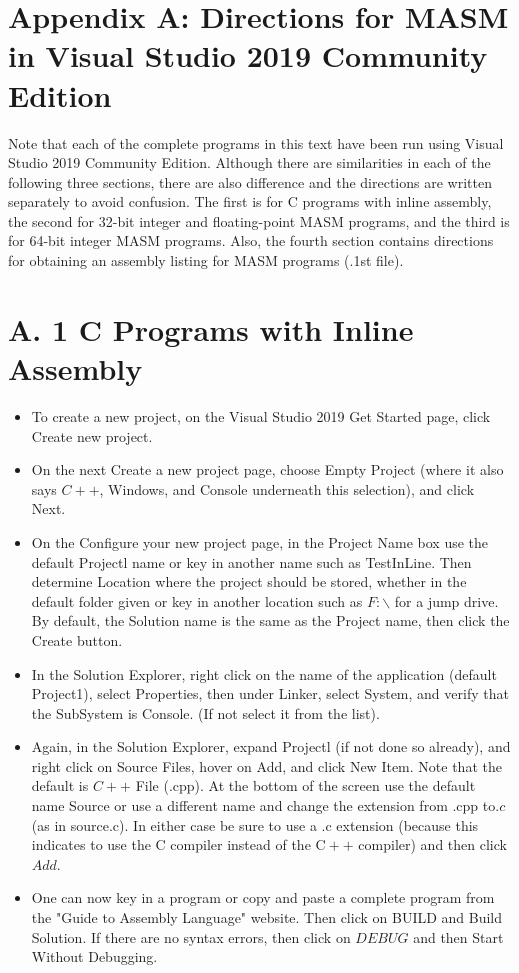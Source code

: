 \documentclass[10pt]{article}
\begin{document}
\section*{Appendix A: Directions for MASM in Visual Studio 2019 Community Edition}
Note that each of the complete programs in this text have been run using Visual Studio 2019 Community Edition. Although there are similarities in each of the following three sections, there are also difference and the directions are written separately to avoid confusion. The first is for C programs with inline assembly, the second for 32-bit integer and floating-point MASM programs, and the third is for 64-bit integer MASM programs. Also, the fourth section contains directions for obtaining an assembly listing for MASM programs (.1st file).

\section*{A. 1 C Programs with Inline Assembly}
\begin{itemize}
  \item To create a new project, on the Visual Studio 2019 Get Started page, click Create new project.
  \item On the next Create a new project page, choose Empty Project (where it also says $C++$, Windows, and Console underneath this selection), and click Next.
  \item On the Configure your new project page, in the Project Name box use the default Projectl name or key in another name such as TestInLine. Then determine Location where the project should be stored, whether in the default folder given or key in another location such as $F: \backslash$ for a jump drive. By default, the Solution name is the same as the Project name, then click the Create button.
  \item In the Solution Explorer, right click on the name of the application (default Project1), select Properties, then under Linker, select System, and verify that the SubSystem is Console. (If not select it from the list).
  \item Again, in the Solution Explorer, expand Projectl (if not done so already), and right click on Source Files, hover on Add, and click New Item. Note that the default is $C++$ File (.cpp). At the bottom of the screen use the default name Source or use a different name and change the extension from .cpp to.$c$ (as in source.c). In either case be sure to use a .c extension (because this indicates to use the C compiler instead of the $\mathrm{C}++$ compiler) and then click $A d d$.
  \item One can now key in a program or copy and paste a complete program from the "Guide to Assembly Language" website. Then click on BUILD and Build Solution. If there are no syntax errors, then click on $D E B U G$ and then Start Without Debugging.
\end{itemize}
\end{document}
